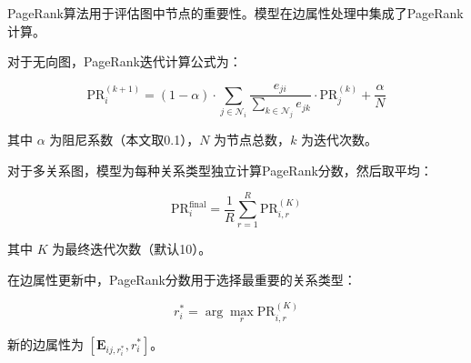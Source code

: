 \documentclass[UTF8, a4paper, 12pt]{article}
\begin{document}
PageRank算法用于评估图中节点的重要性。模型在边属性处理中集成了PageRank计算。

对于无向图，PageRank迭代计算公式为：

\begin{equation}
\text{PR}^{(k+1)}_i = (1 - \alpha) \cdot \sum_{j \in \mathcal{N}_i} \frac{e_{ji}}{\sum_{k \in \mathcal{N}_j} e_{jk}} \cdot \text{PR}^{(k)}_j + \frac{\alpha}{N}
\end{equation}

其中 $\alpha$ 为阻尼系数（本文取0.1），$N$ 为节点总数，$k$ 为迭代次数。

对于多关系图，模型为每种关系类型独立计算PageRank分数，然后取平均：

\begin{equation}
\text{PR}_i^{\text{final}} = \frac{1}{R} \sum_{r=1}^{R} \text{PR}_{i,r}^{(K)}
\end{equation}

其中 $K$ 为最终迭代次数（默认10）。

在边属性更新中，PageRank分数用于选择最重要的关系类型：

\begin{equation}
r_i^* = \arg\max_r \text{PR}_{i,r}^{(K)}
\end{equation}

新的边属性为 $[\mathbf{E}_{ij,r_i^*}, r_i^*]$。
\end{document}

